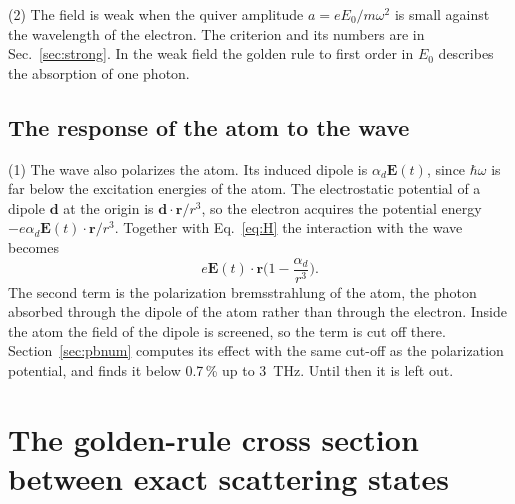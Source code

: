 \documentclass[11pt]{article}
\numberwithin{equation}{section}
\newcommand{\rv}{\mathbf r}
\newcommand{\Ev}{\mathbf E}
\begin{document}
{\noindent}(2) The field is weak when the quiver amplitude
$a=eE_0/m\omega^2$ is small against the wavelength of the electron. The
criterion and its numbers are in Sec.~\ref{sec:strong}. In the weak field the
golden rule to first order in $E_0$ describes the absorption of one photon.

\subsection{The response of the atom to the wave}
\label{sec:pb}
{\noindent}(1) The wave also polarizes the atom. Its induced dipole is
$\alpha_d\Ev(t)$, since $\hbar\omega$ is far below the excitation energies of
the atom. The electrostatic potential of a dipole $\mathbf d$ at the origin is
$\mathbf d\cdot\rv/r^3$, so the electron acquires the potential energy
$-e\alpha_d\Ev(t)\cdot\rv/r^3$. Together with Eq.~\eqref{eq:H} the
interaction with the wave becomes
\begin{equation}
e\Ev(t)\cdot\rv\Big(1-\frac{\alpha_d}{r^3}\Big).
\label{eq:pb-op}
\end{equation}
The second term is the polarization bremsstrahlung of the atom, the photon
absorbed through the dipole of the atom rather than through the electron.
Inside the atom the field of the dipole is screened, so the term is cut off
there. Section~\ref{sec:pbnum} computes its effect with the same cut-off as the
polarization potential, and finds it below 0.7\,\% up to 3~THz. Until then it
is left out.

\section{The golden-rule cross section between exact scattering states}
\label{sec:cross}
\end{document}
